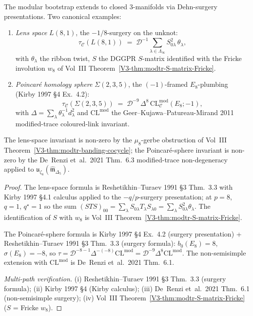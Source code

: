 \begin{theorem}
\label{thm:modbootstrap-lens-poincare-dehn}
\ClaimStatusConditional
The modular bootstrap extends to closed 3-manifolds via
Dehn-surgery presentations. Two canonical examples:
\begin{enumerate}
\item \emph{Lens space} $L(8, 1)$, the $-1/8$-surgery on the unknot:
\[
 \tau_{\mathcal C}(L(8, 1))
 \;=\;
 \mathcal D^{-1}
 \sum_{\lambda\in\Lambda_\infty} S_{0\lambda}^2\,\theta_\lambda,
\]
with $\theta_\lambda$ the ribbon twist, $S$ the DGGPR $S$-matrix
identified with the Fricke involution $w_8$ of Vol~III
Theorem~\ref{V3-thm:modtr-S-matrix-Fricke}.

\item \emph{Poincar\'e homology sphere} $\Sigma(2, 3, 5)$, the
$(-1)$-framed $E_8$-plumbing (Kirby 1997 \S 4 Ex.~4.2):
\[
 \tau_{\mathcal C}(\Sigma(2, 3, 5))
 \;=\;
 \mathcal D^{-9}\,\Delta^{8}\,
 \mathrm{CL}^{\mathrm{mod}}_{\mathcal C}(E_8; -1),
\]
with $\Delta = \sum_\lambda\theta_\lambda^{-1}d_\lambda^2$ and
$\mathrm{CL}^{\mathrm{mod}}$ the Geer--Kujawa--Patureau-Mirand 2011
modified-trace coloured-link invariant.
\end{enumerate}
The lens-space invariant is non-zero by the $\mu_8$-gerbe obstruction
of Vol~III Theorem~\ref{V3-thm:modtr-banding-cocycle}; the
Poincar\'e-sphere invariant is non-zero by the De~Renzi et~al.\ 2021
Thm.~6.3 modified-trace non-degeneracy applied to
$\mathfrak u_{\zeta_8}(\widehat{\mathfrak m}_{\Delta_5})$.
\end{theorem}

\begin{proof}
The lens-space formula is Reshetikhin--Turaev 1991 \S 3 Thm.~3.3 with
Kirby 1997 \S 4.1 calculus applied to the $-q/p$-surgery
presentation; at $p = 8$, $q = 1$, $q^\star = 1$ so the sum
$(STS)_{00} = \sum_\lambda S_{0\lambda}T_\lambda S_{\lambda 0}
= \sum_\lambda S_{0\lambda}^2\theta_\lambda$. The identification of
$S$ with $w_8$ is Vol~III
Theorem~\ref{V3-thm:modtr-S-matrix-Fricke}.

The Poincar\'e-sphere formula is Kirby 1997 \S 4 Ex.~4.2 (surgery
presentation) + Reshetikhin--Turaev 1991 \S 3 Thm.~3.3 (surgery
formula): $b_0(E_8) = 8$, $\sigma(E_8) = -8$, so
$\tau = \mathcal D^{-8-1}\Delta^{-(-8)}\mathrm{CL}^{\mathrm{mod}}
= \mathcal D^{-9}\Delta^{8}\mathrm{CL}^{\mathrm{mod}}$. The
non-semisimple extension with $\mathrm{CL}^{\mathrm{mod}}$ is
De~Renzi et~al.\ 2021 Thm.~6.1.

\emph{Multi-path verification.}
(i) Reshetikhin--Turaev 1991 \S 3 Thm.~3.3 (surgery formula);
(ii) Kirby 1997 \S 4 (Kirby calculus);
(iii) De~Renzi et~al.\ 2021 Thm.~6.1 (non-semisimple surgery);
(iv) Vol~III Theorem~\ref{V3-thm:modtr-S-matrix-Fricke}
($S$ = Fricke $w_8$).
\end{proof}

